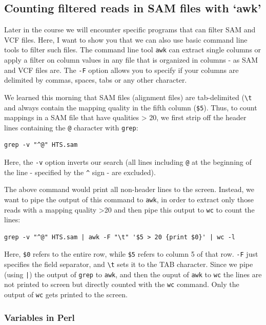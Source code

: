 \documentclass[11pt]{article}
\begin{document}
\subsection{Counting filtered reads in SAM files with `awk'}
\label{sec-4-5}

Later in the course we will encounter specific programs that can filter
SAM and VCF files. Here, I want to show you that we can also use basic
command line tools to filter such files.  The command line tool \texttt{awk}
can extract single columns or apply a filter on column values in
any file that is organized in columns - as SAM and VCF files
are. The \texttt{-F} option allows you to specify if your columns are
delimited by commas, spaces, tabs or any other character.

We learned this morning that SAM files (alignment files) are
 tab-delimited (\texttt{\textbackslash{}t} and always contain the mapping quality in the
 fifth column (\texttt{\$5}). Thus, to count mappings in a SAM file that
 have qualities > 20, we first strip off the header lines
 containing the \texttt{@} character  with \texttt{grep}:


\begin{verbatim}
grep -v "^@" HTS.sam
\end{verbatim}

Here, the \texttt{-v} option inverts our search (all lines including \texttt{@} at
the beginning of the line - specified by the \texttt{\textasciicircum{}} sign - are excluded).

The above command would print all non-header lines to the
screen. Instead, we want to pipe the output of this command to \texttt{awk},
in order to extract only those reads with a mapping quality >20 and
then pipe this output to \texttt{wc} to count the lines:


\begin{verbatim}
grep -v "^@" HTS.sam | awk -F "\t" '$5 > 20 {print $0}' | wc -l
\end{verbatim}

Here, \texttt{\$0} refers to the entire row, while \texttt{\$5} refers to column 5 of
that row. \texttt{-F} just specifies the field separator, and
\texttt{\textbackslash{}t} sets it to the TAB character. Since we pipe (using \texttt{|}) the output of \texttt{grep} to
\texttt{awk}, and then the ouput of \texttt{awk} to \texttt{wc} the lines are not printed to screen but directly
counted with the \texttt{wc} command. Only the output of \texttt{wc} gets printed to the screen.
\subsubsection{Variables in Perl}
\label{sec-5-1}
\end{document}
